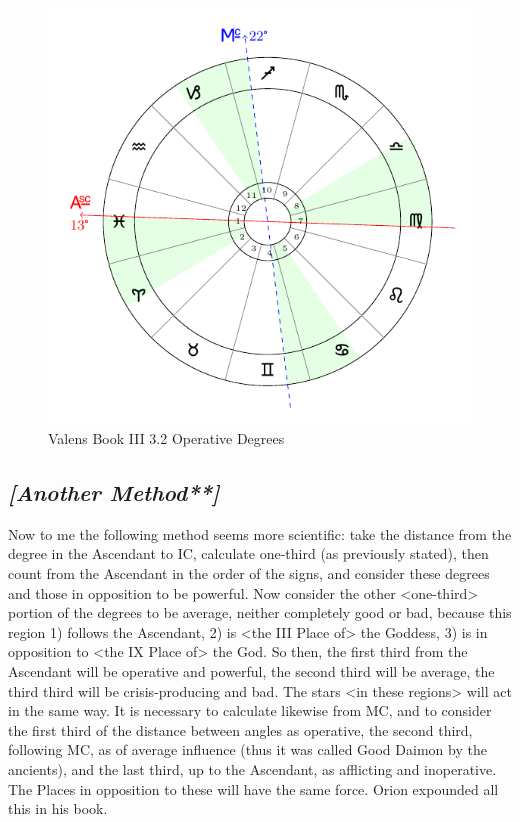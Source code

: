 \begin{figure}[H]
\includegraphics[width=\textwidth]{charts/3_02_operative_degrees}
\caption{Valens Book III 3.2 Operative Degrees}
\end{figure}
\subsection{\textit{[Another Method**]}}
Now to me the following method seems more scientific: take the distance from the degree in the Ascendant to IC, calculate one-third (as previously stated), then count from the Ascendant in the order of the signs, and consider these degrees and those in opposition to be powerful. Now consider the other <one-third> portion of the degrees to be average, neither completely good or bad, because this region 1) follows the Ascendant, 2) is <the III Place of> the Goddess, 3) is in opposition to <the IX Place of> the God. So then, the first third from the Ascendant will be operative and powerful, the second third will be average, the third third will be crisis-producing and bad. The stars <in these regions> will act in the same way.
It is necessary to calculate likewise from MC, and to consider the first third of the distance between angles as operative, the second third, following MC, as of average influence (thus it was called Good Daimon by the ancients), and the last third, up to the Ascendant, as afflicting and inoperative. The Places in opposition to these will have the same force. Orion expounded all this in his book.

